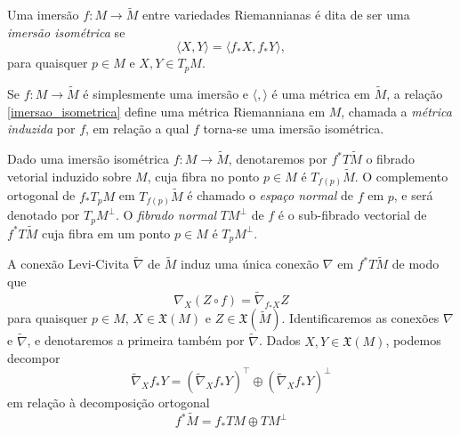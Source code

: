 \begin{definicao}
	Uma imersão $f: M \rightarrow \tilde{M}$ entre variedades Riemannianas é dita de ser uma \textit{imersão isométrica} se
	\begin{equation}
	\label{imersao_isometrica}
	\langle X,Y \rangle = \langle f_* X, f_* Y \rangle,
	\end{equation}
	para quaisquer $p \in M$ e $X,Y \in T_p M$.
\end{definicao}

\begin{observacao}
	Se $f: M \rightarrow \tilde{M}$ é simplesmente uma imersão e $\langle , \rangle$ é uma métrica em $\tilde{M}$, a relação \eqref{imersao_isometrica} define uma métrica Riemanniana em $M$, chamada a \textit{métrica induzida} por $f$, em relação a qual $f$ torna-se uma imersão isométrica.
\end{observacao}

\begin{observacao}
	Dado uma imersão isométrica $f:M \rightarrow \tilde{M}$, denotaremos por $f^* T \tilde{M}$ o fibrado vetorial induzido sobre $M$, cuja fibra no ponto $p \in M$ é $T_{f(p)} \tilde{M}$. O complemento ortogonal de $f_* T_p M$ em $T_{f(p)} \tilde{M}$ é chamado o \textit{espaço normal} de $f$ em $p$, e será denotado por $T_p M^\perp$. O \textit{fibrado normal} $TM^\perp$ de $f$ é o sub-fibrado vectorial de $f^* T \tilde{M}$ cuja fibra em um ponto $p \in M$ é $T_p M^\perp$.
\end{observacao}

\begin{observacao}
	A conexão Levi-Civita $\tilde{\nabla}$ de $\tilde{M}$ induz uma única conexão $\nabla$ em $f^* T \tilde{M}$ de modo que
	\begin{equation*}
		\nabla_X (Z \circ f) = \tilde{\nabla}_{f_* X} Z
	\end{equation*}
	para quaisquer $p \in M$, $X \in \mathfrak{X}(M)$ e $Z \in \mathfrak{X}(\tilde{M})$. Identificaremos as conexões $\nabla$ e $\tilde{\nabla}$, e denotaremos a primeira também por $\tilde{\nabla}$. Dados $X,Y \in \mathfrak{X}(M)$, podemos decompor
	\begin{equation*}
		\tilde{\nabla}_X f_* Y = \left( \tilde{\nabla}_X f_* Y \right)^{\top} \oplus \left( \tilde{\nabla}_X f_* Y \right)^{\perp}
	\end{equation*}
	em relação à decomposição ortogonal
	\begin{equation*}
		f^* \tilde{M} = f_* TM \oplus TM^\perp
	\end{equation*}
\end{observacao}

